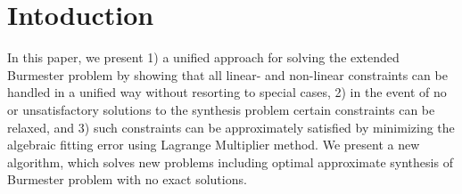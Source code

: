\section{Intoduction}
In this paper, we present 1) a unified approach for solving the extended Burmester problem by showing that all linear- and non-linear constraints can be handled in a unified way without resorting to special cases, 2) in the event of no or unsatisfactory solutions to the synthesis problem certain constraints can be relaxed, and 3) such constraints can be approximately satisfied by minimizing the algebraic fitting error using Lagrange Multiplier method. We present a new algorithm, which solves new problems including optimal approximate synthesis of Burmester problem with no exact solutions.

